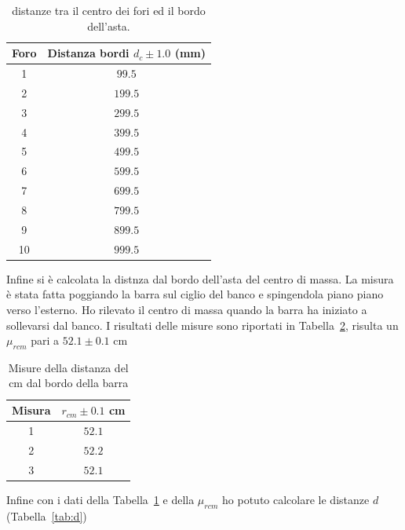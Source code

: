 \documentclass[a4paper,12pt]{article}
\begin{document}
\begin{table}[h!]
\centering
\begin{tabular}{c c}
     \toprule
     Foro  & Distanza bordi $d_c\pm 1.0$ (mm) \\
     \midrule
    1 &  $ 99.5 $\\
    2 &  $199.5$\\
    3 &  $299.5$\\
    4 &  $399.5$\\
    5 &  $499.5$\\
    6 &  $599.5$\\
    7 &  $699.5$\\
    8 &  $799.5$\\
    9 &  $899.5$\\
    10 & $999.5$\\
     \bottomrule
  \end{tabular}
  \caption{distanze tra il centro dei fori ed il bordo dell'asta.}%
\label{tab:misure_centro_bordo}
\end{table}

Infine si è calcolata la distnza dal bordo dell'asta del centro di massa. La misura è stata fatta poggiando la barra sul ciglio del banco e spingendola piano piano verso l'esterno. Ho rilevato il centro di massa quando la barra ha iniziato a sollevarsi dal banco. I risultati delle misure sono riportati in Tabella~\ref{tab:rcm}, risulta un $\mu_{rcm}$ pari a $52.1 \pm 0.1$ cm

\begin{table}[h!]
\centering
\begin{tabular}{c c}
    \toprule 
    Misura & $r_{cm} \pm 0.1$ cm\\
    \midrule
    1 & $52.1$ \\
    2 & $52.2$ \\
    3 & $52.1$ \\
    \bottomrule
\end{tabular}
\caption{Misure della distanza del cm dal bordo della barra}%
\label{tab:rcm}
\end{table}

Infine con i dati della Tabella~\ref{tab:misure_centro_bordo} e della $\mu_{rcm}$ ho potuto calcolare le distanze $d$ (Tabella~\ref{tab:d})
\end{document}
